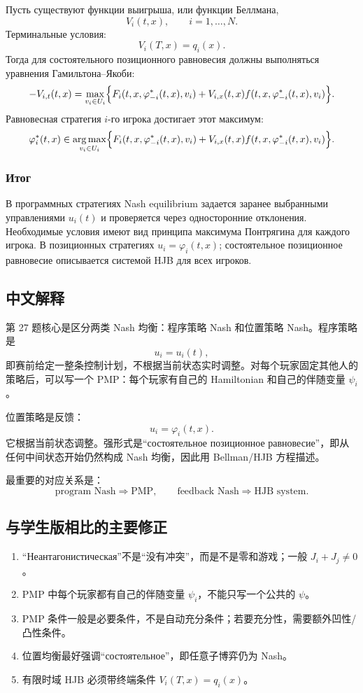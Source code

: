 \documentclass[12pt,a4paper]{article}
\DeclareMathOperator*{\argmax}{arg\,max}
\begin{document}
Пусть существуют функции выигрыша, или функции Беллмана,
\[
 V_i(t,x),\qquad i=1,\ldots,N.
\]
Терминальные условия:
\[
 V_i(T,x)=q_i(x).
\]
Тогда для состоятельного позиционного равновесия должны выполняться уравнения Гамильтона--Якоби:
\[
 -V_{i,t}(t,x)=\max_{v_i\in U_i}\Bigl\{F_i(t,x,\varphi_{-i}^*(t,x),v_i)+V_{i,x}(t,x)f(t,x,\varphi_{-i}^*(t,x),v_i)\Bigr\}.
\]
Равновесная стратегия $i$-го игрока достигает этот максимум:
\[
 \varphi_i^*(t,x)\in\argmax_{v_i\in U_i}\Bigl\{F_i(t,x,\varphi_{-i}^*(t,x),v_i)+V_{i,x}(t,x)f(t,x,\varphi_{-i}^*(t,x),v_i)\Bigr\}.
\]

\subsubsection{Итог}

В программных стратегиях Nash equilibrium задается заранее выбранными управлениями $u_i(t)$ и проверяется через односторонние отклонения. Необходимые условия имеют вид принципа максимума Понтрягина для каждого игрока. В позиционных стратегиях $u_i=\varphi_i(t,x)$; состоятельное позиционное равновесие описывается системой HJB для всех игроков.

\subsection{中文解释}

第 27 题核心是区分两类 Nash 均衡：程序策略 Nash 和位置策略 Nash。程序策略是
\[
 u_i=u_i(t),
\]
即赛前给定一整条控制计划，不根据当前状态实时调整。对每个玩家固定其他人的策略后，可以写一个 PMP：每个玩家有自己的 Hamiltonian 和自己的伴随变量 $\psi_i$。

位置策略是反馈：
\[
 u_i=\varphi_i(t,x).
\]
它根据当前状态调整。强形式是“состоятельное позиционное равновесие”，即从任何中间状态开始仍然构成 Nash 均衡，因此用 Bellman/HJB 方程描述。

最重要的对应关系是：
\[
 \text{program Nash} \Rightarrow \text{PMP},\qquad \text{feedback Nash} \Rightarrow \text{HJB system}.
\]

\subsection{与学生版相比的主要修正}

\begin{enumerate}
\item “Неантагонистическая”不是“没有冲突”，而是不是零和游戏；一般 $J_i+J_j\ne0$。
\item PMP 中每个玩家都有自己的伴随变量 $\psi_i$，不能只写一个公共的 $\psi$。
\item PMP 条件一般是必要条件，不是自动充分条件；若要充分性，需要额外凹性/凸性条件。
\item 位置均衡最好强调“состоятельное”，即任意子博弈仍为 Nash。
\item 有限时域 HJB 必须带终端条件 $V_i(T,x)=q_i(x)$。
\end{enumerate}
\end{document}
